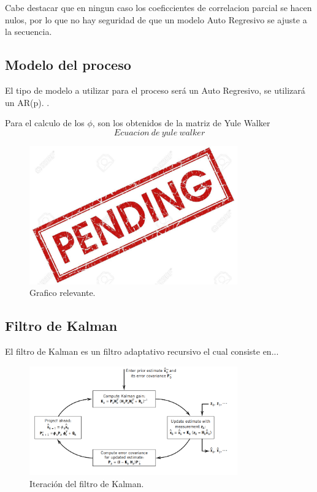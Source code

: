 Cabe destacar que en ningun caso los coeficcientes de correlacion parcial se hacen nulos, por lo que no hay seguridad de que un modelo Auto Regresivo se ajuste a la secuencia.
\subsection{Modelo del proceso}
\label{subsec:modelo}

El tipo de modelo a utilizar para el proceso será un Auto Regresivo, se utilizará un AR(p). .

Para el calculo de los $\phi$, son los obtenidos de la matriz de Yule Walker
\begin{equation}
Ecuacion \ de \ yule \  walker
\end{equation}


\begin{figure}[H]
\centering
	\includegraphics[width=0.8\textwidth, trim = {0 0 0 0.7cm},clip]{./Imagenes/pend.jpg}
	\caption{Grafico relevante.}
	\label{fig:Rxxcalc}
\end{figure}


\subsection{Filtro de Kalman}
El filtro de Kalman es un filtro adaptativo recursivo el cual consiste en...
\begin{figure}[H]
\centering
	\includegraphics[width=0.8\textwidth, trim = {0 0 0 0.7cm},clip]{./Imagenes/kalman_loop.png}
	\caption{Iteración del filtro de Kalman.}
	\label{fig:Kalman_loop}
\end{figure}

